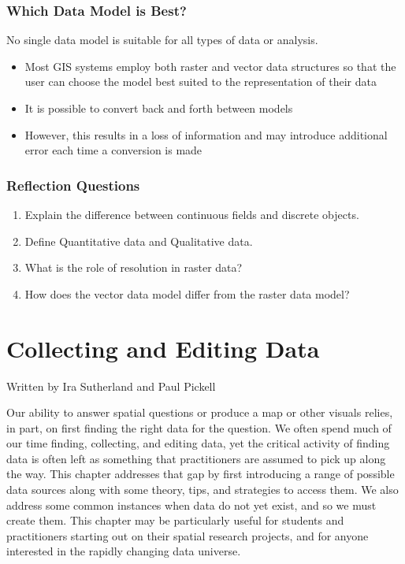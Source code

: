 \documentclass[
]{book}
\providecommand{\tightlist}{%
  \setlength{\itemsep}{0pt}\setlength{\parskip}{0pt}}
\begin{document}
\subsection{Which Data Model is Best?}\label{which-data-model-is-best}

No single data model is suitable for all types of data or analysis.

\begin{itemize}
\tightlist
\item
  Most GIS systems employ both raster and vector data structures so that the user can choose the model best suited to the representation of their data
\item
  It is possible to convert back and forth between models
\item
  However, this results in a loss of information and may introduce additional error each time a conversion is made
\end{itemize}

\subsection*{Reflection Questions}\label{reflection-questions-2}

\begin{enumerate}
\def\labelenumi{\arabic{enumi}.}
\tightlist
\item
  Explain the difference between continuous fields and discrete objects.
\item
  Define Quantitative data and Qualitative data.
\item
  What is the role of resolution in raster data?
\item
  How does the vector data model differ from the raster data model?
\end{enumerate}

\chapter{Collecting and Editing Data}\label{collecting-and-editing-data}

Written by
Ira Sutherland and Paul Pickell

Our ability to answer spatial questions or produce a map or other visuals relies, in part, on first finding the right data for the question. We often spend much of our time finding, collecting, and editing data, yet the critical activity of finding data is often left as something that practitioners are assumed to pick up along the way. This chapter addresses that gap by first introducing a range of possible data sources along with some theory, tips, and strategies to access them. We also address some common instances when data do not yet exist, and so we must create them. This chapter may be particularly useful for students and practitioners starting out on their spatial research projects, and for anyone interested in the rapidly changing data universe.
\end{document}
